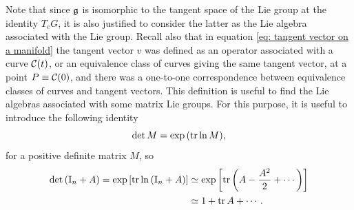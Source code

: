 Note that since $\mathfrak{g}$ is isomorphic to the tangent space of the Lie group at the identity $T_eG$, it is also justified to consider the latter as the Lie algebra associated with the Lie group. Recall also that in equation \eqref{eq: tangent vector on a manifold} the tangent vector $v$ was defined as an operator associated with a curve $\mathcal{C}(t)$, or an equivalence class of curves giving the same tangent vector, at a point $P \equiv \mathcal{C}(0)$, and there was a one-to-one correspondence between equivalence classes of curves and tangent vectors. This definition is useful to find the Lie algebras associated with some matrix Lie groups. For this purpose, it is useful to introduce the following identity 
\begin{equation}
\label{eq: positive matrix identity}
    \det{M} = \exp{(\mathrm{tr}\,{\ln{M}})},
\end{equation}
for a positive definite matrix $M$, so 
\begin{equation}
    \begin{split}
        \det{(\mathbb{I}_n + A)} = \exp{[\mathrm{tr}\,{\ln{(\mathbb{I}_n + A)}}]} &\simeq \exp{\bigg[\mathrm{tr}\,{\bigg(A - \frac{A^2}{2} + \cdots \bigg)}\bigg]} \\
        &\simeq 1 + \mathrm{tr}\,{A} + \cdots.
    \end{split}
\end{equation}
